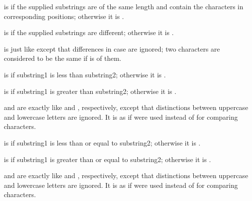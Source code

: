 \beginlist
     

 is  if the supplied substrings are of
the same length and contain the  characters in corresponding
positions; otherwise it is .


 is  if the supplied substrings are 
different; otherwise it is .


 is just like  
except that differences in case are ignored; 
two characters are considered to be the same if  is  of them.
     

 is  if substring1 is less than substring2;
otherwise it is .


 is  if substring1 is greater than substring2;
otherwise it is .


 and  
are exactly like  and , respectively,
except that distinctions between uppercase and lowercase letters are ignored.
It is as if  were used instead of 
for comparing characters.


 is  if substring1 is less than or equal to substring2;
otherwise it is .


 is  if substring1 is greater than or equal to substring2;
otherwise it is .


 and 
are exactly like  and , respectively, 
except that distinctions between uppercase and lowercase letters are ignored.
It is as if  were used instead of 
for comparing characters.

